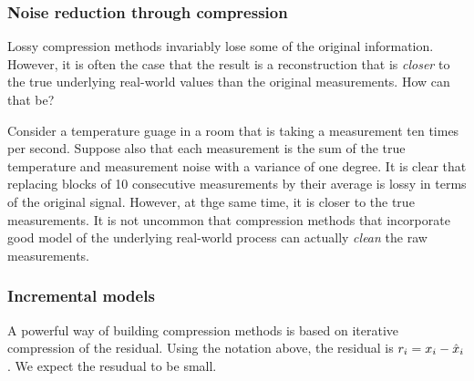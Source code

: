 {\subsubsection{Noise reduction through compression}
Lossy compression methods invariably lose some of the original
information. However, it is often the case that the result is a
reconstruction that is {\em closer} to the true underlying real-world
values than the original measurements. How can that be?

Consider a temperature guage in a room that is taking a measurement
ten times per second. Suppose also that each measurement is the sum of
the true temperature and measurement noise with a variance of one
degree.  It is clear that replacing blocks of 10 consecutive
measurements by their average is lossy in terms of the original
signal. However, at thge same time, it is closer to the true
measurements. It is not uncommon that compression methods that
incorporate good model of the underlying real-world process can
actually {\em clean} the raw measurements.

\subsubsection{Incremental models}
A powerful way of building compression methods is based on iterative
compression of the residual. Using the notation above, the residual is 
$r_i=x_i - \hat{x}_i$. We expect the resudual to be small.}

